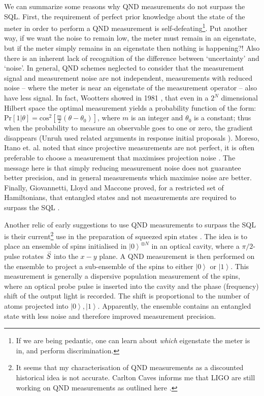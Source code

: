 \documentclass[reqno]{amsart}
\newcommand{\ket}[1]{\left| #1 \right>}
\newcommand{\myvec}[1]{\accentset{\rightharpoonup}{#1}}
\def\func#1#2{\mathrm{#1}\left[#2\right]}
\begin{document}
We can summarize some reasons why QND measurements do not surpass the SQL. First, the requirement of perfect prior knowledge about the state of the meter in order to perform a QND measurement is self-defeating\footnote{If we are being pedantic, one can learn about \emph{which} eigenstate the meter is in, and perform discrimination.}. Put another way, if we want the noise to remain low, the meter must remain in an eigenstate, but if the meter simply remains in an eigenstate then nothing is happening?! Also there is an inherent lack of recognition of the difference between `uncertainty' and `noise'. In general, QND schemes neglected to consider that the measurement signal and measurement noise are not independent, measurements with reduced noise -- where the meter is near an eigenstate of the measurement operator -- also have less signal. In fact, Wootters showed in 1981 \cite{Wootters1981}, that even in a $2^N$ dimensional Hilbert space the optimal measurement yields a probability function of the form: $\func{Pr}{1|\theta} = \func{cos^2}{\frac{m}{2}(\theta - \theta_0)}$, where $m$ is an integer and $\theta_0$ is a constant; thus when the probability to measure an observable goes to one or zero, the gradient disappears (Unruh used related arguments in response initial proposals \cite{Unruh1978}). Moreso, Itano et. al. noted that since projective measurements are not perfect, it is often preferable to choose a measurement that maximises projection noise \cite{Itano1993}. The message here is that simply reducing measurement noise does not guarantee better precision, and in general measurements which maximise noise are better. Finally, Giovannetti, Lloyd and Maccone proved, for a restricted set of Hamiltonians, that entangled states and not measurements are required to surpass the SQL \cite{Giovannetti2006}.

Another relic of early suggestions to use QND measurements to surpass the SQL is their current\footnote{It seems that my characterisation of QND measurements as a discounted historical idea is not accurate. Carlton Caves informs me that LIGO are still working on QND measurements as outlined here \cite{Kimble2001}.} use in the preparation of squeezed spin states \cite{Kuzmich2000, Appel2009,  Koschorreck2010, LouchetChauvet2010, SchleierSmith2010, Sewell2012, Bohnet2014, Cox2016, Hosten2016, Hosten2016a, Braverman2019, Malia2020, Greve2022, Malia2022}. The idea is to place an ensemble of spins initialised in $\ket{0}^{\otimes N}$ in an optical cavity, where a $\pi/2$-pulse rotates $\myvec{S}$ into the $x - y$ plane. A QND measurement is then performed on the ensemble to project a sub-ensemble of the spins to either $\ket{0}$ or $\ket{1}$. This measurement is generally a dispersive population measurement of the spins, where an optical probe pulse is inserted into the cavity and the phase (frequency) shift of the output light is recorded. The shift is proportional to the number of atoms projected into $\ket{0},\ket{1}$. Apparently, the ensemble contains an entangled state with less noise and therefore improved measurement precision.
\end{document}
